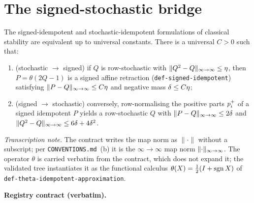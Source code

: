 \section{The signed-stochastic bridge}\label{sec:classical-equiv}

\begin{lemma}\label{lem:classical-equiv}
The signed-idempotent and stochastic-idempotent formulations of classical stability are
equivalent up to universal constants. There is a universal $C>0$ such that:
\begin{enumerate}
\item (stochastic $\to$ signed) if $Q$ is row-stochastic with
  $\lVert Q^2-Q \rVert_{\infty\to\infty}\le\eta$, then $P=\theta(2Q-1)$ is a signed affine retraction
  (\texttt{def-signed-idempotent}) satisfying $\lVert P-Q \rVert_{\infty\to\infty}\le C\eta$ and negative
  mass $\delta\le C\eta$;
\item (signed $\to$ stochastic) conversely, row-normalising the positive parts
  $p_i^{+}$ of a signed idempotent $P$ yields a row-stochastic $Q$ with
  $\lVert P-Q \rVert_{\infty\to\infty}\le 2\delta$ and $\lVert Q^2-Q \rVert_{\infty\to\infty}\le 6\delta+4\delta^2$.
\end{enumerate}
\emph{Transcription note.} The contract writes the map norm as $\lVert\cdot\rVert$
without a subscript; per \texttt{CONVENTIONS.md}~(b) it is the $\infty\!\to\!\infty$ map
norm $\lVert \cdot \rVert_{\infty\to\infty}$. The operator $\theta$ is carried verbatim from the contract,
which does not expand it; the validated tree instantiates it as the functional calculus
$\theta(X)=\tfrac12(I+\operatorname{sgn} X)$ of \texttt{def-theta-idempotent-approximation}.
\end{lemma}

\noindent\textbf{Registry contract (verbatim).}

